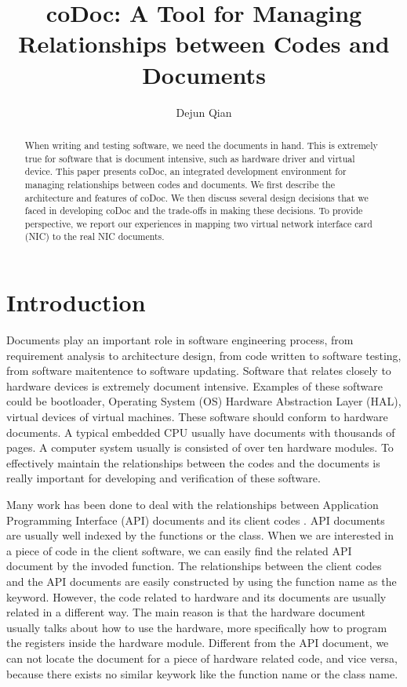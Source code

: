 \documentclass[11pt,letterpaper,oneside]{article}
\title{coDoc: A Tool for Managing Relationships between Codes and Documents}
\author{Dejun Qian}
\begin{document}
\maketitle

\begin{abstract}
When writing and testing software, 
we need the documents in hand.
This is extremely true for software that is document intensive, 
such as hardware driver and virtual device.
This paper presents coDoc, 
an integrated development environment for managing relationships between codes and documents. 
We first describe the architecture and features of coDoc.
We then discuss several design decisions that we faced in developing coDoc and the trade-offs in making these decisions.
To provide perspective,
we report our experiences in mapping two virtual network interface card (NIC) to the real NIC documents.
\end{abstract}

\section{Introduction}
\label{sec:introduction}
Documents play an important role in software engineering process,
from requirement analysis to architecture design,
from code written to software testing,
from software maitentence to software updating.
Software that relates closely to hardware devices is extremely document intensive.
Examples of these software could be bootloader, 
Operating System (OS) Hardware Abstraction Layer (HAL),
virtual devices of virtual machines.
These software should conform to hardware documents.
A typical embedded CPU usually have documents with thousands of pages.
A computer system usually is consisted of over ten hardware modules.
To effectively maintain the relationships between the codes and the documents is really important for developing and verification of these software.

Many work has been done to deal with the relationships between Application Programming Interface (API) documents and its client codes \cite{Pandita_inferring_2012}.
API documents are usually well indexed by the functions or the class.
When we are interested in a piece of code in the client software,
we can easily find the related API document by the invoded function.
The relationships between the client codes and the API documents are easily constructed by using the function name as the keyword.
However, the code related to hardware and its documents are usually related in a different way.
The main reason is that the hardware document usually talks about how to use the hardware,
more specifically how to program the registers inside the hardware module.
Different from the API document,
we can not locate the document for a piece of hardware related code, and vice versa,
because there exists no similar keywork like the function name or the class name.
\end{document}
